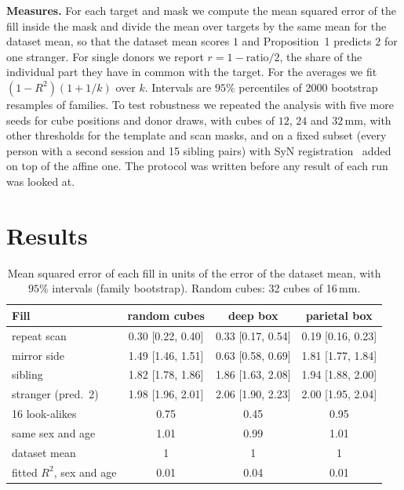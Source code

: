\documentclass{article}
\begin{document}
\textbf{Measures.} For each target and mask we compute the mean squared error of the fill inside the mask and divide the mean over targets by the same mean for the dataset mean, so that the dataset mean scores $1$ and Proposition~1 predicts $2$ for one stranger.
For single donors we report $r=1-\mathrm{ratio}/2$, the share of the individual part they have in common with the target.
For the averages we fit $(1-R^2)(1+1/k)$ over $k$.
Intervals are $95\%$ percentiles of 2000 bootstrap resamples of families.
To test robustness we repeated the analysis with five more seeds for cube positions and donor draws, with cubes of $12$, $24$ and $32$\,mm, with other thresholds for the template and scan masks, and on a fixed subset (every person with a second session and 15 sibling pairs) with SyN registration~\cite{avants2008} added on top of the affine one.
The protocol was written before any result of each run was looked at.

\section{Results}
\label{sec:results}

\begin{table}[t]
\centering
\caption{Mean squared error of each fill in units of the error of the dataset mean, with $95\%$ intervals (family bootstrap). Random cubes: 32 cubes of 16\,mm.}
\label{tab:fills}
\footnotesize
\setlength{\tabcolsep}{2.5pt}
\begin{tabular}{@{}lccc@{}}
\toprule
Fill & random cubes & deep box & parietal box \\
\midrule
repeat scan & 0.30 [0.22, 0.40] & 0.33 [0.17, 0.54] & 0.19 [0.16, 0.23] \\
mirror side & 1.49 [1.46, 1.51] & 0.63 [0.58, 0.69] & 1.81 [1.77, 1.84] \\
sibling & 1.82 [1.78, 1.86] & 1.86 [1.63, 2.08] & 1.94 [1.88, 2.00] \\
stranger (pred.\ 2) & 1.98 [1.96, 2.01] & 2.06 [1.90, 2.23] & 2.00 [1.95, 2.04] \\
16 look-alikes & 0.75 & 0.45 & 0.95 \\
same sex and age & 1.01 & 0.99 & 1.01 \\
dataset mean & 1 & 1 & 1 \\
\midrule
fitted $R^2$, sex and age & 0.01 & 0.04 & 0.01 \\
\bottomrule
\end{tabular}
\end{table}
\end{document}
